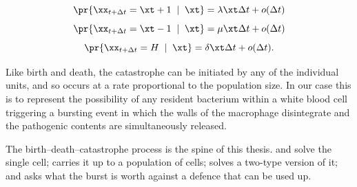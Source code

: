 $$\pr{\xx_{t + \Delta t}  = \xt + 1 \;\; | \;\; \xt} = \lambda \xt \Delta t + o(\Delta t)$$
$$\pr{\xx_{t + \Delta t}  = \xt - 1 \;\; | \;\; \xt} = \mu \xt \Delta t + o(\Delta t)$$
$$\pr{\xx_{t + \Delta t}  = H \;\; | \;\; \xt} = \delta \xt \Delta t + o(\Delta t).$$

\noindent
Like birth and death, the catastrophe can be initiated by any of the individual
units, and so occurs at a rate proportional to the population size. In our case
this is to represent the possibility of any resident bacterium within a white
blood cell triggering a bursting event in which the walls of the macrophage
disintegrate and the pathogenic contents are simultaneously released.

The birth--death--catastrophe process is the spine of this thesis.
 and
 solve the single cell;
 carries it up to a population
of cells;  solves a two-type version of it;
and  asks what the burst is worth
against a defence that can be used up.
